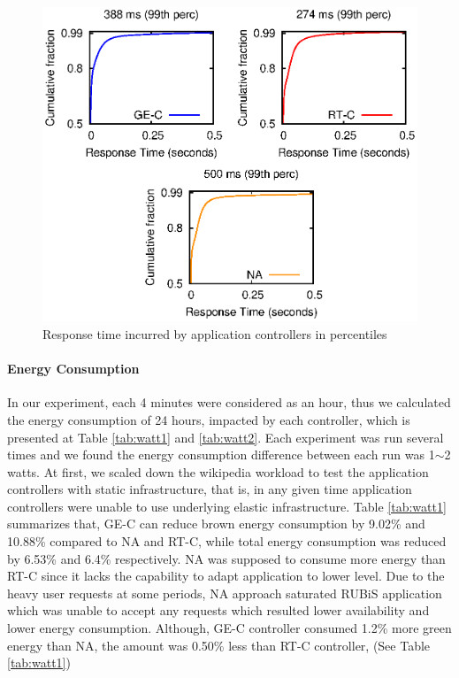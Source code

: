 \begin{figure} [htb]
\centering
\includegraphics[scale=.68]{Graphs/ucc2.eps}
\caption{Response time incurred by application controllers in percentiles}
\label{fig:perc}
\end{figure}







\paragraph*{\textbf{Energy Consumption}}

In our experiment, each 4 minutes were considered as an
hour, thus we calculated the energy consumption of 24
hours, impacted by each controller, which is presented at
Table \ref{tab:watt1} and \ref{tab:watt2}. Each experiment was run several times and we found the energy consumption difference between each run
was 1$\sim$2 watts. At first, we scaled down the wikipedia workload to test the application controllers with static infrastructure, that is, in any given time application controllers were unable to use underlying elastic infrastructure. Table \ref{tab:watt1} summarizes that, GE-C can reduce brown energy consumption by 9.02\% and 10.88\% compared to NA and RT-C, while total energy consumption was reduced by 6.53\% and 6.4\% respectively. NA was supposed to consume more energy than RT-C since it lacks the capability to adapt application to lower level. Due to the heavy  user requests at some periods, NA approach saturated RUBiS application which was unable to accept any requests which resulted lower availability and lower energy consumption. Although, GE-C controller consumed 1.2\% more green energy than NA, the amount was 0.50\% less than RT-C controller, (See Table \ref{tab:watt1})


